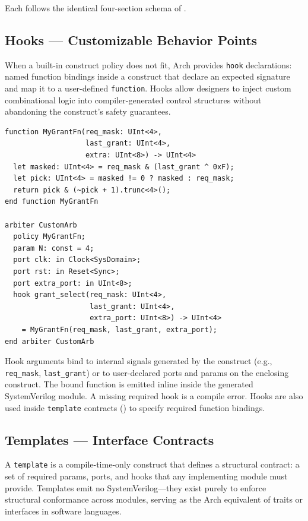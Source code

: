 \documentclass[manuscript]{acmart}
\begin{document}
Each follows the identical four-section schema of .

\subsection{Hooks --- Customizable Behavior Points}\label{sec:hooks}

When a built-in construct policy does not fit, Arch provides \texttt{hook} declarations: named function bindings inside a construct that declare an expected signature and map it to a user-defined \texttt{function}. Hooks allow designers to inject custom combinational logic into compiler-generated control structures without abandoning the construct's safety guarantees.

\begin{lstlisting}[language=Arch,caption={Custom arbiter policy via hook},label={lst:hook}]
function MyGrantFn(req_mask: UInt<4>,
                   last_grant: UInt<4>,
                   extra: UInt<8>) -> UInt<4>
  let masked: UInt<4> = req_mask & (last_grant ^ 0xF);
  let pick: UInt<4> = masked != 0 ? masked : req_mask;
  return pick & (~pick + 1).trunc<4>();
end function MyGrantFn

arbiter CustomArb
  policy MyGrantFn;
  param N: const = 4;
  port clk: in Clock<SysDomain>;
  port rst: in Reset<Sync>;
  port extra_port: in UInt<8>;
  hook grant_select(req_mask: UInt<4>,
                    last_grant: UInt<4>,
                    extra_port: UInt<8>) -> UInt<4>
    = MyGrantFn(req_mask, last_grant, extra_port);
end arbiter CustomArb
\end{lstlisting}

Hook arguments bind to internal signals generated by the construct (e.g., \texttt{req\_mask}, \texttt{last\_grant}) or to user-declared ports and params on the enclosing construct. The bound function is emitted inline inside the generated SystemVerilog module. A missing required hook is a compile error. Hooks are also used inside \texttt{template} contracts () to specify required function bindings.

\subsection{Templates --- Interface Contracts}\label{sec:templates}

A \texttt{template} is a compile-time-only construct that defines a structural contract: a set of required params, ports, and hooks that any implementing module must provide. Templates emit no SystemVerilog---they exist purely to enforce structural conformance across modules, serving as the Arch equivalent of traits or interfaces in software languages.
\end{document}
